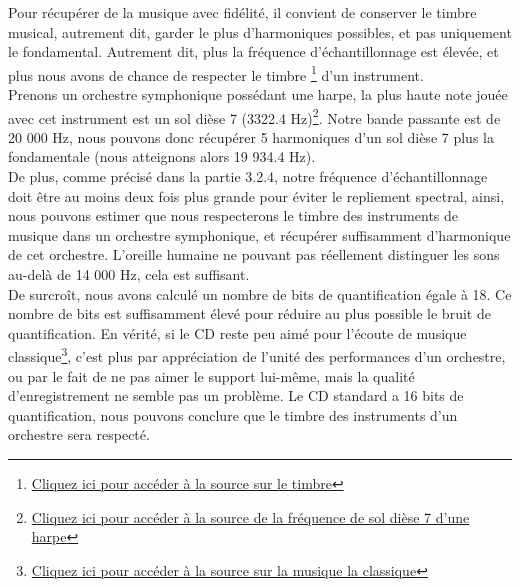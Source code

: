 Pour récupérer de la musique avec fidélité, il convient de conserver le timbre musical, autrement dit, garder le plus d'harmoniques possibles, et pas uniquement le fondamental. Autrement dit, plus la fréquence d'échantillonnage est élevée, et plus nous avons de chance de respecter le timbre \footnote{\href{https://fr.wikipedia.org/wiki/Gain_d\%C3\%A9cibel}{Cliquez ici pour accéder à la source sur le timbre}} d'un instrument. 
\\Prenons un orchestre symphonique possédant une harpe, la plus haute note jouée avec cet instrument est un sol dièse 7 (3322.4 Hz)\footnote{\href{http://hyperphysics.phy-astr.gsu.edu/hbase/Music/orchins.html}{Cliquez ici pour accéder à la source de la fréquence de sol dièse 7 d'une harpe}}. Notre bande passante est de 20 000 Hz, nous pouvons donc récupérer 5 harmoniques d'un sol dièse 7 plus la fondamentale (nous atteignons alors 19 934.4 Hz).
\\De plus, comme précisé dans la partie 3.2.4, notre fréquence d'échantillonnage doit être au moins deux fois plus grande pour éviter le repliement spectral, ainsi, nous pouvons estimer que nous respecterons le timbre des instruments de musique dans un orchestre symphonique, et récupérer suffisamment d'harmonique de cet orchestre. L'oreille humaine ne pouvant pas réellement distinguer les sons au-delà de 14 000 Hz, cela est suffisant.
\\De surcroît, nous avons calculé un nombre de bits de quantification égale à 18. Ce nombre de bits est suffisamment élevé pour réduire au plus possible le bruit de quantification. En vérité, si le CD reste peu aimé pour l'écoute de musique classique\footnote{\href{https://www.radiofrance.fr/franceculture/podcasts/hashtag/la-musique-classique-peut-elle-encore-resister-a-la-dematerialisation-7501004}{Cliquez ici pour accéder à la source sur la musique la classique}}, c'est plus par appréciation de l'unité des performances d'un orchestre, ou par le fait de ne pas aimer le support  lui-même, mais la qualité d'enregistrement ne semble pas un problème. Le CD standard a 16 bits de quantification, nous pouvons conclure que le timbre des instruments d'un orchestre sera respecté.

